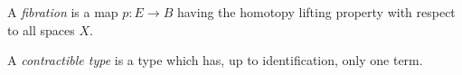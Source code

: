
\begin{definition}
    A \emph{fibration} is a map $p:E\to B$ having the homotopy lifting property with respect to all spaces $X$.
\end{definition}

\begin{definition}
    A \emph{contractible type} is a type which has, up to identification, only one term.
\end{definition}